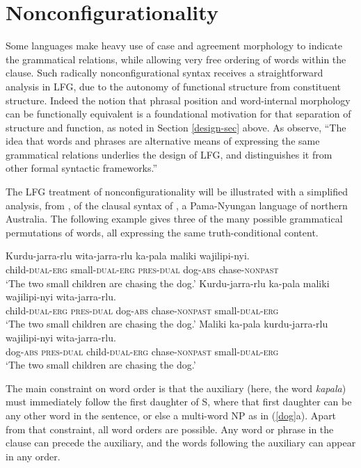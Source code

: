 \section{Nonconfigurationality}
\label{nonconfig-sec}
Some languages make heavy use of case and agreement morphology to indicate the grammatical relations, while allowing very free ordering of words within the clause.  Such radically nonconfigurational syntax receives a straightforward analysis in LFG, due to the autonomy of functional structure from constituent structure.  Indeed the notion that phrasal position and word-internal morphology can be functionally equivalent is a foundational motivation for that separation of structure and function, as noted in Section \ref{design-sec} above.  As \citet[5]{BATW2016a} observe, ``The idea that words and phrases are alternative means of expressing the
same grammatical relations underlies the design of LFG, and distinguishes it from other formal syntactic frameworks.''  

The LFG treatment of nonconfigurationality will be illustrated with a simplified analysis, from \citet[352-3]{BATW2016a}, of the clausal syntax of , a Pama-Nyungan language of northern Australia.  The following example gives three of the many possible grammatical permutations of words, all expressing the same truth-conditional content.

 \begin{exe} 
\ex	\label{dog}
\begin{xlist}
\ex 
\gll Kurdu-jarra-rlu wita-jarra-rlu ka-pala maliki wajilipi-nyi. \\
child-\textsc{dual-erg} small-\textsc{dual-erg} \textsc{pres-dual}
dog-\textsc{abs} chase-\textsc{nonpast}\\
\glt `The two small children are chasing the dog.' 
\ex 
\gll Kurdu-jarra-rlu ka-pala maliki wajilipi-nyi wita-jarra-rlu. \\
child-\textsc{dual-erg}  \textsc{pres-dual}
dog-\textsc{abs} chase-\textsc{nonpast} small-\textsc{dual-erg}\\
\glt `The two small children are chasing the dog.' 
\ex 
\gll Maliki ka-pala  kurdu-jarra-rlu wajilipi-nyi wita-jarra-rlu. \\
dog-\textsc{abs} \textsc{pres-dual} child-\textsc{dual-erg} chase-\textsc{nonpast} small-\textsc{dual-erg} 
\\
\glt `The two small children are chasing the dog.' 
\end{xlist}
\end{exe}
The main constraint on word order is that the auxiliary (here, the word \textit{kapala}) must immediately follow the first daughter of S, where that first daughter can be any other word in the sentence, or else a multi-word NP as in (\ref{dog}a).  Apart from that constraint, all word orders are possible.  Any word or phrase in the clause can precede the auxiliary, and the words following the auxiliary can appear in any order. 

